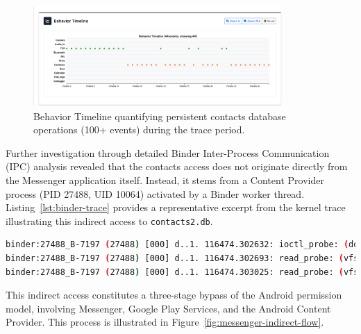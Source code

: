\documentclass[a4paper,12pt]{report}
\begin{document}
\begin{figure}[H]
    \centering
    \includegraphics[width=0.85\textwidth]{messenger-none-behav.png}
    \caption{Behavior Timeline quantifying persistent contacts database operations (100+ events) during the trace period.}
    \label{fig:messenger-none-behav}
\end{figure}
Further investigation through detailed Binder Inter-Process Communication (IPC) analysis revealed that the contacts access does not originate directly from the Messenger application itself. Instead, it stems from a Content Provider process (PID 27488, UID 10064) activated by a Binder worker thread. Listing~\ref{lst:binder-trace} provides a representative excerpt from the kernel trace illustrating this indirect access to \texttt{contacts2.db}.

\clearpage
\begin{lstlisting}[language=bash, caption={Kernel trace showing contacts database access via a Binder worker thread.}, label={lst:binder-trace}]
binder:27488_B-7197 (27488) [000] d..1. 116474.302632: ioctl_probe: (do_vfs_ioctl) file=... pathname="contacts2.db"
binder:27488_B-7197 (27488) [000] d..1. 116474.302693: read_probe: (vfs_read) file=... buf=... count=100 pathname="contacts2.db"
binder:27488_B-7197 (27488) [000] d..1. 116474.303025: read_probe: (vfs_read) file=... count=4096 pathname="contacts2.db"
\end{lstlisting}

This indirect access constitutes a three-stage bypass of the Android permission model, involving Messenger, Google Play Services, and the Android Content Provider. This process is illustrated in Figure~\ref{fig:messenger-indirect-flow}.
\end{document}
